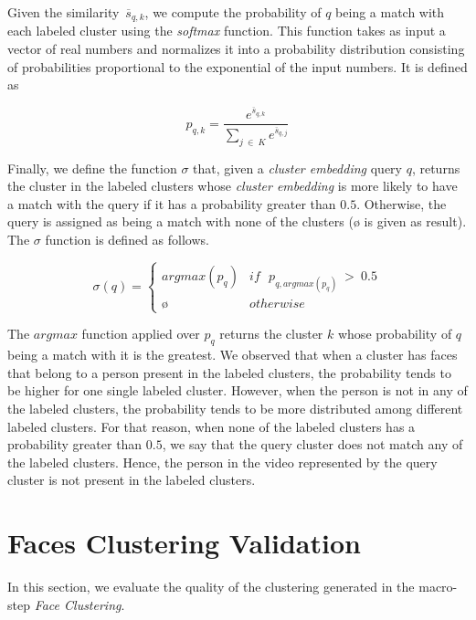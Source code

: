 Given the similarity~$\overline{s}_{q,k}$, we compute the probability of $q$ being a match with each labeled cluster using the \emph{softmax} function.
This function takes as input a vector of real numbers and normalizes it into a probability distribution consisting of probabilities proportional to the exponential of the input numbers. 
It is defined as

\begin{equation}
\label{equation:probability}
    p_{q,k} = \frac{e^{\overline{s}_{q,k}}}{\sum_{j~\in~K}{e^{\overline{s}_{q,j}}}}
\end{equation}

Finally, we define the function $\sigma$ that, given a \emph{cluster embedding} query $q$, returns the cluster in the labeled clusters whose \emph{cluster embedding} is more likely to have a match with the query if it has a probability greater than $0.5$. Otherwise, the query is assigned as being a match with none of the clusters ($\text{\o}$ is given as result). The $\sigma$ function is defined as follows.

\begin{equation}
\label{equation:sigma}
    \sigma{(q)} = \begin{cases}argmax(p_q) & if~~~p_{q,argmax(p_q)}~>~0.5\\\text{\o} & otherwise\end{cases}
\end{equation}

The $argmax$ function applied over $p_q$ returns the cluster $k$ whose probability of $q$ being a match with it is the greatest. 
We observed that when a cluster has faces that belong to a person present in the labeled clusters, the probability tends to be higher for one single labeled cluster.
However, when the person is not in any of the labeled clusters, the probability tends to be more distributed among different labeled clusters.
For that reason, when none of the labeled clusters has a probability greater than $0.5$, we say that the query cluster does not match any of the labeled clusters.
Hence, the person in the video represented by the query cluster is not present in the labeled clusters.

\section{Faces Clustering Validation}
\label{sec:recognition_clustering_validation}

In this section, we evaluate the quality of the clustering generated in the macro-step \emph{Face Clustering}.

